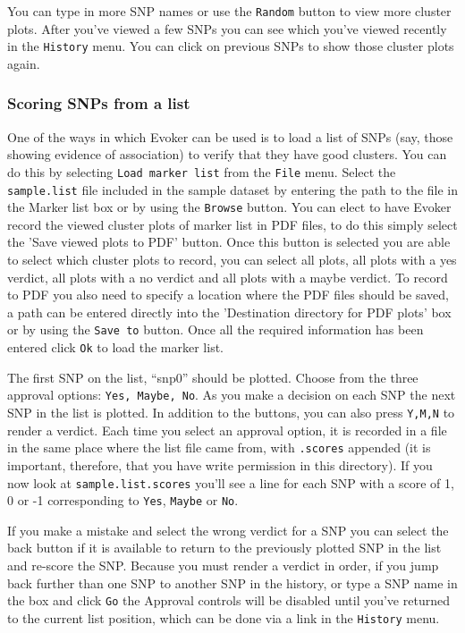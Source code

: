 \documentclass{article}
\begin{document}
You can type in more SNP names or use the \texttt{Random} button to view more cluster plots. After you've viewed a few SNPs you can see which you've viewed recently in the \texttt{History} menu. You can click on previous SNPs to show those cluster plots again.

\subsubsection{Scoring SNPs from a list}

One of the ways in which Evoker can be used is to load a list of SNPs (say, those showing evidence of association) to verify that they have good clusters. You can do this by selecting \texttt{Load marker list} from the \texttt{File} menu. Select the \texttt{sample.list} file included in the sample dataset by entering the path to the file in the Marker list box or by using the \texttt{Browse} button. You can elect to have Evoker record the viewed cluster plots of marker list in PDF files, to do this simply select the 'Save viewed plots to PDF' button. Once this button is selected you are able to select which cluster plots to record, you can select all plots, all plots with a yes verdict, all plots with a no verdict and all plots with a maybe verdict. To record to PDF you also need to specify a location where the PDF files should be saved, a path can be entered directly into the 'Destination directory for PDF plots' box or by using the \texttt{Save to} button. Once all the required information has been entered click \texttt{Ok} to load the marker list.

The first SNP on the list, ``snp0'' should be plotted. Choose from the three approval options: \texttt{Yes, Maybe, No}. As you make a decision on each SNP the next SNP in the list is plotted. In addition to the buttons, you can also press \texttt{Y,M,N} to render a verdict. Each time you select an approval option, it is recorded in a file in the same place where the list file came from, with \texttt{.scores} appended (it is important, therefore, that you have write permission in this directory). If you now look at \texttt{sample.list.scores} you'll see a line for each SNP with a score of 1, 0 or -1 corresponding to \texttt{Yes}, \texttt{Maybe} or \texttt{No}. 

If you make a mistake and select the wrong verdict for a SNP you can select the back button if it is available to return to the previously plotted SNP in the list and re-score the SNP. Because you must render a verdict in order, if you jump back further than one SNP to another SNP in the history, or type a SNP name in the box and click \texttt{Go} the Approval controls will be disabled until you've returned to the current list position, which can be done via a link in the \texttt{History} menu.
\end{document}

